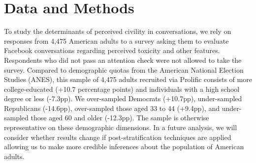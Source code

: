 \documentclass{article}
\begin{document}



\section{Data and Methods}

To study the determinants of perceived civility in conversations, we rely on responses from 4,475 American adults to a survey asking them to evaluate Facebook conversations regarding perceived toxicity and other features. Respondents who did not pass an attention check were not allowed to take the survey. Compared to demographic quotas from the American National Election Studies (ANES), this sample of 4,475 adults recruited via Prolific consists of more college-educated (+10.7 percentage points) and individuals with a high school degree or less (-7.3pp). We over-sampled Democrats (+10.7pp), under-sampled Republicans (-14.6pp), over-sampled those aged 33 to 44 (+9.4pp), and under-sampled those aged 60 and older (-12.3pp). The sample is otherwise representative on these demographic dimensions. In a future analysis, we will consider whether results change if post-stratification techniques are applied allowing us to make more credible inferences about the population of American adults.
\end{document}
